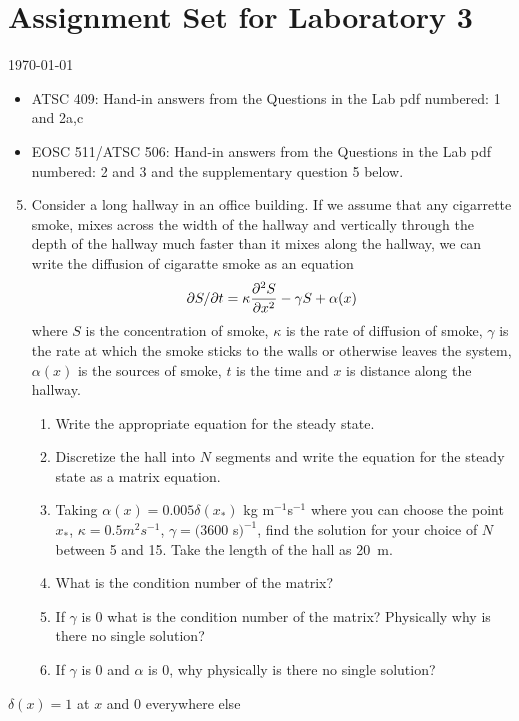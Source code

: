 \documentclass[12pt]{article}
\begin{document}
\section*{Assignment Set for Laboratory 3}

{\small \today \hspace{0.1in} \currenttime}

\begin{itemize}
\item ATSC 409: Hand-in answers from the Questions in the Lab pdf numbered: 1 and 2a,c
  
\item EOSC 511/ATSC 506:  Hand-in answers from the Questions in the Lab pdf
numbered: 2 and 3 and the supplementary question 5 below.
\end{itemize}

\begin{enumerate}
\setcounter{enumi}{4}
\item Consider a long hallway in an office building.  If we assume that any cigarrette smoke, mixes across the width of the hallway and vertically through the depth of the hallway much faster than it mixes along the hallway, we can write the diffusion of cigaratte smoke as an equation
\[
\partial S/\partial t = \kappa \frac {\partial^2 S}{\partial x^2} - \gamma S + \alpha(x)
\]
where $S$ is the concentration of smoke, $\kappa$ is the rate of diffusion of smoke, $\gamma$ is the rate at which the smoke sticks to the walls or otherwise leaves the system, $\alpha(x)$ is the sources of smoke, $t$ is the time and $x$ is distance along the hallway.
\begin{enumerate}
\item Write the appropriate equation for the steady state.
\item Discretize the hall into $N$ segments and write the equation for the steady state as a matrix equation.
\item Taking $\alpha(x) = 0.005 \delta(x_*)$ kg m$^{-1}$s$^{-1}$ where you can choose the point $x_*$, $\kappa = 0.5 m^2 s^{-1}$, $\gamma = (3600$ s$)^{-1}$, find the solution for your choice of $N$ between 5 and 15.  Take the length of the hall as 20~m.
\item What is the condition number of the matrix?
\item If $\gamma$ is 0 what is the condition number of the matrix?  Physically why is there no single solution?
\item If $\gamma$ is 0 and $\alpha$ is 0, why physically is there no single solution?
\end{enumerate}
\end{enumerate}

$\delta(x) = 1$ at $x$ and $0$ everywhere else
\end{document}
